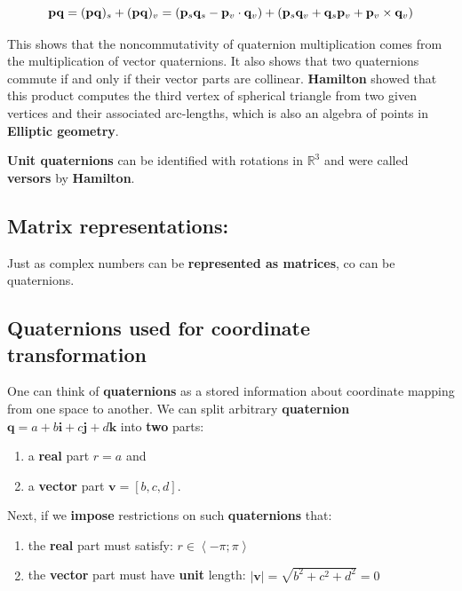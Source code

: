 \begin{equation}
    \mathbf{p} \mathbf{q} = (\mathbf{p} \mathbf{q})_s + (\mathbf{p} \mathbf{q})_v
    = (\mathbf{p}_s \mathbf{q}_s -  \mathbf{p}_v \cdot \mathbf{q}_v )
    + (\mathbf{p}_s \mathbf{q}_v + \mathbf{q}_s \mathbf{p}_v + \mathbf{p}_v \times \mathbf{q}_v)
\end{equation}

This shows that the noncommutativity of quaternion multiplication comes from the
multiplication of vector quaternions. It also shows that two quaternions commute
if and only if their vector parts are collinear. \textbf{Hamilton} showed that
this product computes the third vertex of spherical triangle from two given
vertices and their associated arc-lengths, which is also an algebra of points
in \textbf{Elliptic geometry}.

\textbf{Unit quaternions} can be identified with rotations in $ \mathbb{R}^3 $
and were called \textbf{versors} by \textbf{Hamilton}.


\subsection{Matrix representations:}

Just as complex numbers can be \textbf{represented as matrices}, co can be quaternions.



\subsection{Quaternions used for coordinate transformation}

One can think of \textbf{quaternions} as a stored information about coordinate
mapping from one space to another. We can split arbitrary \textbf{quaternion}\\
$ \mathbf{q} = a + b \mathbf{i} + c \mathbf{j} + d \mathbf{k} $ into \textbf{two} parts:

\begin{enumerate}
    \item a \textbf{real} part $ r = a $ and

    \item a \textbf{vector} part $ \mathbf{v} = \left[ b, c, d \right] $.

\end{enumerate}

Next, if we \textbf{impose} restrictions on such \textbf{quaternions} that:

\begin{enumerate}
    \item the \textbf{real} part must satisfy: $ r \in \left< -\pi; \pi \right> $

    \item the \textbf{vector} part must have \textbf{unit} length:
        $ | \textbf{v} | = \sqrt{b^2 + c^2 + d^2} = 0 $

\end{enumerate}

